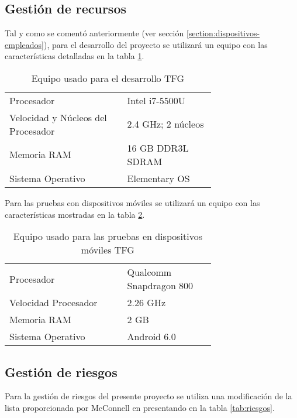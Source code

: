 	\subsection{Gestión de recursos}
	Tal y como se comentó anteriormente (ver sección \ref{section:dispositivos-empleados}), para el desarrollo del proyecto se utilizará un equipo con las características detalladas en la tabla \ref{tab:portatil2}. 
	
	\begin{table}[H]
	  \centering 
	  \begin{tabular}{p{0.4\linewidth}p{0.3\linewidth}}
	    \toprule
		Procesador 							& Intel i7-5500U								\\
		Velocidad y Núcleos del Procesador & 2.4 GHz; 2 núcleos 							\\
		Memoria RAM 						& 16 \ac{GB} \ac{DDR}3L \ac{SDRAM} 			\\
		Sistema Operativo					& Elementary \ac{OS} 							\\
	    \hline
	  \end{tabular}
	  \caption{Equipo usado para el desarrollo \ac{TFG}}
	  \label{tab:portatil2}
	\end{table}
	
	Para las pruebas con dispositivos móviles se utilizará un equipo con las características mostradas en la tabla \ref{tab:movil2}.
	\begin{table}[H]
	  \centering 
	  \begin{tabular}{p{0.4\linewidth}p{0.3\linewidth}}
	    \toprule
		Procesador 	& Qualcomm Snapdragon 800		\\
		Velocidad Procesador 	& 2.26 GHz 			\\
		Memoria RAM 			& 2 \ac{GB} 		\\
		Sistema Operativo 		& Android 6.0 		\\
	    \hline
	  \end{tabular}
	  \caption{Equipo usado para las pruebas en dispositivos móviles \ac{TFG}}
	  \label{tab:movil2}
	\end{table}
	
	\subsection{Gestión de riesgos}
	Para la gestión de riesgos del presente proyecto se utiliza una modificación de la lista proporcionada por McConnell en \cite{Mcc97} presentando en la tabla \ref{tab:riesgos}.
	
